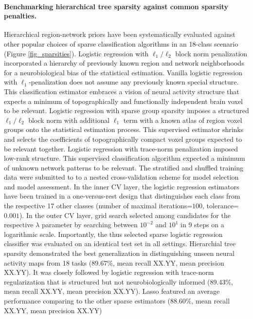 \documentclass{article} %
\begin{document}
\paragraph{Benchmarking hierarchical tree sparsity against
common sparsity penalties.}
Hierarchical region-network priors have been systematically
evaluated against other popular choices of sparse classification algorithms
in an 18-class scenario
(Figure \ref{fig_sparsities}).
%
Logistic regression with $\ell_1/\ell_2$ block norm penalization
incorporated a hierarchy of previously known region and network neighborhoods
for a neurobiological bias of the statistical estimation.
%
Vanilla logistic regression with $\ell_1$-penalization
does not assume any previously known special structure.
This classification estimator embraces a vision of neural activity structure
that expects a minimum of
topographically and functionally independent brain voxel to be relevant.
%
Logistic regression with sparse group sparsity
imposes a structured $\ell_1/\ell_2$ block norm with additional $\ell_1$ term
with a known atlas of region voxel groups onto the statistical estimation process.
This supervised estimator shrinks and selects the coefficients
of topographically compact voxel groups expected to be relevant together.
%
Logistic regression with trace-norm penalization
imposed low-rank structure.
This supervised classification algorithm
expected a minimum of unknown network patterns
to be relevant.
%
The stratified and shuffled training data were submitted to
to a nested cross-validation scheme
for model selection and model assessment.
In the inner CV layer, the logistic regression estimators
have been trained in a one-versus-rest design that
distinguishes each class from
the respective 17 other classes
(number of maximal iterations=$100$, tolerance=$0.001$).
In the outer CV layer, grid search
selected among candidates for the respective $\lambda$ parameter
by searching between $10^{-2}$ and $10^{1}$ in 9 steps on a logarithmic scale.
Importantly, the thus selected sparse logistic regression classifier was
evaluated on an identical test set in all settings.
%
Hierarchial tree sparsity demonstrated the best generalization
in distinguishing unseen neural activity maps from 18 tasks
(89.67\%, mean recall XX.YY, mean precision XX.YY).
It was closely followed by logistic regression with trace-norm
regularization that is structured but not neurobiologically informed
(89.43\%, mean recall XX.YY, mean precision XX.YY).
Lasso featured an average performance comparing to the other sparse estimators
(88.60\%, mean recall XX.YY, mean precision XX.YY)
\end{document}
